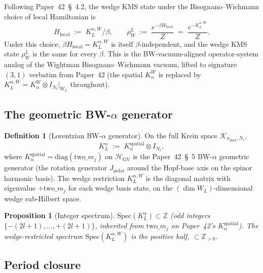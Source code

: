 \documentclass[11pt,a4paper]{article}
\theoremstyle{plain}
\newtheorem{proposition}[theorem]{Proposition}
\theoremstyle{definition}
\newtheorem{definition}[theorem]{Definition}
\newcommand{\nmax}{n_{\max}}
\newcommand{\Nt}{N_t}
\newcommand{\Hilb}{\mathcal{H}}
\newcommand{\Krein}{\mathcal{K}}
\newcommand{\Z}{\mathbb{Z}}
\newcommand{\KL}{K_{L}}
\begin{document}
Following Paper~42~\S~4.2, the wedge KMS state under the
Bisognano--Wichmann choice of local Hamiltonian is
\begin{equation}\label{eq:rho_WL}
   \boxed{\;
   H_{\mathrm{local}} \;:=\; \KL^{\alpha, W} / \beta,
   \qquad
   \rho_W^L \;:=\; \frac{e^{-\beta H_{\mathrm{local}}}}{Z}
   \;=\; \frac{e^{-\KL^{\alpha, W}}}{Z}. \;
   }
\end{equation}
Under this choice, $\beta H_{\mathrm{local}} = \KL^{\alpha, W}$ is itself
$\beta$-independent, and the wedge KMS state $\rho_W^L$ is the same
for every $\beta$. This is the BW-vacuum-aligned operator-system analog
of the Wightman Bisognano--Wichmann vacuum, lifted to signature
$(3, 1)$ verbatim from Paper~42 (the spatial $K_\alpha^W$ is replaced
by $\KL^{\alpha, W} = K_\alpha^W \otimes I_{\Nt}|_{W_L}$ throughout).

\subsection{The geometric BW-$\alpha$ generator}

\begin{definition}[Lorentzian BW-$\alpha$ generator]\label{def:K_L_alpha}
On the full Krein space $\Krein_{\nmax, \Nt}$,
\begin{equation}\label{eq:K_L_alpha}
   \KL^\alpha \;:=\; K_\alpha^{\mathrm{spatial}} \otimes I_{\Nt},
\end{equation}
where $K_\alpha^{\mathrm{spatial}} = \mathrm{diag}(\mathrm{two}\_m_j)$ on
$\Hilb_{\mathrm{GV}}$ is the Paper~42~\S~5 BW-$\alpha$ geometric
generator (the rotation generator $J_{\mathrm{polar}}$ around the
Hopf-base axis on the spinor harmonic basis). The wedge restriction
$\KL^{\alpha, W}$ is the diagonal matrix with eigenvalue
$+\mathrm{two}\_m_j$ for each wedge basis state, on the
$(\dim W_L)$-dimensional wedge sub-Hilbert space.
\end{definition}

\begin{proposition}[Integer spectrum]\label{prop:integer_spectrum_L}
$\mathrm{Spec}(\KL^\alpha) \subset \Z$ (odd integers
$\{-(2l+1), \ldots, +(2l+1)\}$, inherited from $\mathrm{two}\_m_j$
on Paper~42's $K_\alpha^{\mathrm{spatial}}$). The wedge-restricted
spectrum $\mathrm{Spec}(\KL^{\alpha, W})$ is the positive half,
$\subset \Z_{> 0}$.
\end{proposition}

\subsection{Period closure}\label{sec:bw_alpha_closure}
\end{document}
